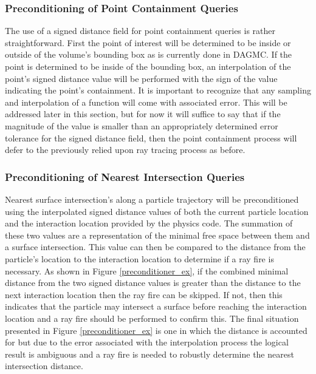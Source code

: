 \documentclass[12pt, a4paper]{article}
\begin{document}
\subsubsection{Preconditioning of Point Containment Queries}

The use of a signed distance field for point containment queries is rather straightforward. First the point of interest will be determined to be inside or outside of the volume's bounding box as is currently done in DAGMC. If the point is determined to be inside of the bounding box, an interpolation of the point's signed distance value will be performed with the sign of the value indicating the point's containment. It is important to recognize that any sampling and interpolation of a function will come with associated error. This will be addressed later in this section, but for now it will suffice to say that if the magnitude of the value is smaller than an appropriately determined error tolerance for the signed distance field, then the point containment process will defer to the previously relied upon ray tracing process as before.

\subsubsection{Preconditioning of Nearest Intersection Queries}

Nearest surface intersection's along a particle trajectory will be preconditioned using the interpolated signed distance values of both the current particle location and the interaction location provided by the physics code. The summation of these two values are a representation of the minimal free space between them and a surface intersection. This value can then be compared to the distance from the particle's location to the interaction location to determine if a ray fire is necessary. As shown in Figure \ref{preconditioner_ex}, if the combined minimal distance from the two signed distance values is greater than the distance to the next interaction location then the ray fire can be skipped. If not, then this indicates that the particle may intersect a surface before reaching the interaction location and a ray fire should be performed to confirm this. The final situation presented in Figure \ref{preconditioner_ex} is one in which the distance is accounted for but due to the error associated with the interpolation process the logical result is ambiguous and a ray fire is needed to robustly determine the nearest intersection distance. 
\end{document}

